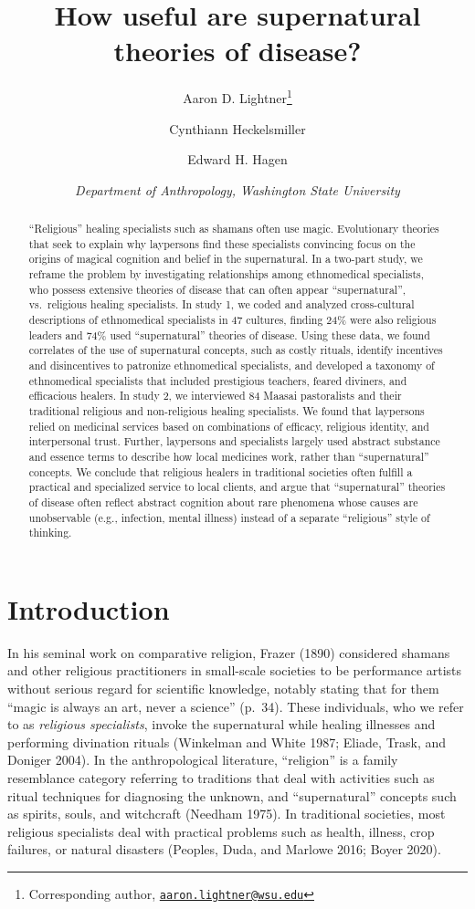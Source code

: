 \documentclass[
  11pt,
]{article}
\title{\LARGE \textbf{How useful are supernatural theories of disease?}}
\author{Aaron D. Lightner\footnote{Corresponding author, \href{mailto:aaron.lightner@wsu.edu}{\nolinkurl{aaron.lightner@wsu.edu}}} \and Cynthiann Heckelsmiller \and Edward H. Hagen}
\date{\emph{Department of Anthropology, Washington State University}}
\begin{document}
\maketitle
\begin{abstract}
``Religious'' healing specialists such as shamans often use magic. Evolutionary theories that seek to explain why laypersons find these specialists convincing focus on the origins of magical cognition and belief in the supernatural. In a two-part study, we reframe the problem by investigating relationships among ethnomedical specialists, who possess extensive theories of disease that can often appear ``supernatural'', vs.~religious healing specialists. In study 1, we coded and analyzed cross-cultural descriptions of ethnomedical specialists in 47 cultures, finding 24\% were also religious leaders and 74\% used ``supernatural'' theories of disease. Using these data, we found correlates of the use of supernatural concepts, such as costly rituals, identify incentives and disincentives to patronize ethnomedical specialists, and developed a taxonomy of ethnomedical specialists that included prestigious teachers, feared diviners, and efficacious healers. In study 2, we interviewed 84 Maasai pastoralists and their traditional religious and non-religious healing specialists. We found that laypersons relied on medicinal services based on combinations of efficacy, religious identity, and interpersonal trust. Further, laypersons and specialists largely used abstract substance and essence terms to describe how local medicines work, rather than ``supernatural'' concepts. We conclude that religious healers in traditional societies often fulfill a practical and specialized service to local clients, and argue that ``supernatural'' theories of disease often reflect abstract cognition about rare phenomena whose causes are unobservable (e.g., infection, mental illness) instead of a separate ``religious'' style of thinking.
\end{abstract}

\hypertarget{introduction}{%
\section{Introduction}\label{introduction}}

In his seminal work on comparative religion, Frazer (1890) considered shamans and other religious practitioners in small-scale societies to be performance artists without serious regard for scientific knowledge, notably stating that for them ``magic is always an art, never a science'' (p.~34). These individuals, who we refer to as \emph{religious specialists}, invoke the supernatural while healing illnesses and performing divination rituals (Winkelman and White 1987; Eliade, Trask, and Doniger 2004). In the anthropological literature, ``religion'' is a family resemblance category referring to traditions that deal with activities such as ritual techniques for diagnosing the unknown, and ``supernatural'' concepts such as spirits, souls, and witchcraft (Needham 1975). In traditional societies, most religious specialists deal with practical problems such as health, illness, crop failures, or natural disasters (Peoples, Duda, and Marlowe 2016; Boyer 2020).
\end{document}
